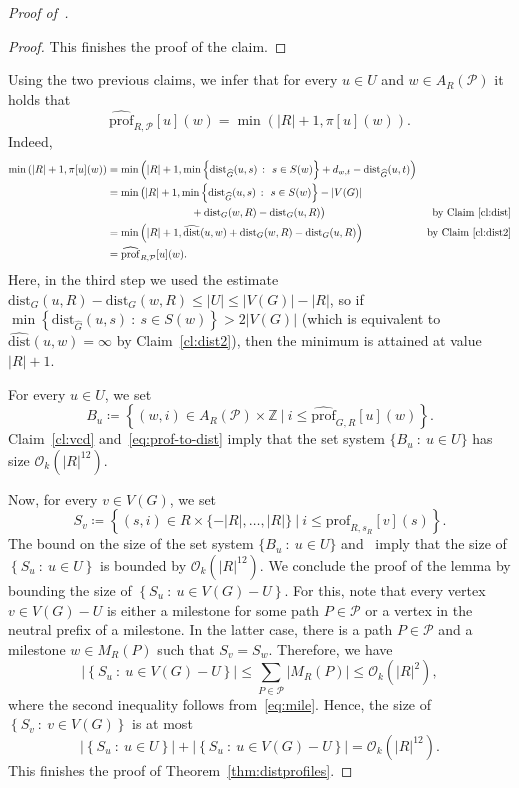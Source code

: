\documentclass[11pt,a4paper]{article}
\newcommand{\Oh}{\mathcal{O}}
\newcommand{\distprofile}[3]{\mathrm{prof}_{#1,#2}[#3]}
\newcommand{\hatprofile}[3]{\widehat{\mathrm{prof}}_{#1,#2}[#3]}
\newcommand{\dist}{\mathrm{dist}}
\renewcommand{\leq}{\leqslant}
\renewcommand{\le}{\leqslant}
\renewcommand{\setminus}{-}
\begin{document}
\begin{proof}[Proof of~]
\begin{proof}
    This finishes the proof of the claim.
  \end{proof}
  
  Using the two previous claims, we infer that for every $u \in U$ and $w \in A_R(\mathcal{P})$ it holds that
  \begin{equation}\label{eq:prof-to-dist}
    \hatprofile{R}{\mathcal{P}}{u}(w) = \min(|R|+1, \pi[u](w)).
  \end{equation}
  Indeed, 
  \begin{align*}
  \min\left(|R|+1, \pi[u](w)\right) &= \min\left(|R|+1,\min\left\{\dist_{\widehat{G}}(u,s)~\colon~s\in S(w)\right\}+d_{w,t}-\dist_{\widehat{G}}(u,t)\right)\\
  &=\min\big(|R|+1, \min\left\{\dist_{\widehat{G}}(u,s)~\colon~s\in S(w)\right\} - |V(G)| &\\
  &\qquad\qquad\qquad\qquad + \dist_G(w,R)-\dist_G(u,R)\big) &\text{by Claim~\ref{cl:dist}}\\
  &=\min\left(|R|+1, \widehat{\dist}(u,w) + \dist_G(w,R)-\dist_G(u,R)\right)&\text{by Claim~\ref{cl:dist2}}\\
  &=\hatprofile{R}{\mathcal{P}}{u}(w).
  \end{align*}
  Here, in the third step we used the estimate $\dist_G(u,R) - \dist_G(w,R) \leq |U| \leq |V(G)|-|R|$, 
  so if $\min\left\{\dist_{\widehat{G}}(u,s)~\colon~s\in S(w)\right\} > 2|V(G)|$
  (which is equivalent to $\widehat{\dist}(u,w) = \infty$ by Claim~\ref{cl:dist2}),
  then the minimum is attained at value $|R|+1$.

  For every $u\in U$, we set
    $$B_u\coloneqq\left\{(w,i) \in A_R(\mathcal{P}) \times \mathbb{Z}~|~i \leq \hatprofile{G}{R}{u}(w)\right\}.$$
  Claim~\ref{cl:vcd} and~\eqref{eq:prof-to-dist} imply that the set system $\{B_u~\colon~u\in U\}$
    has size $\mathcal{O}_k(|R|^{12})$.

  
  
  Now, for every $v\in V(G)$, we set $$S_v\coloneqq\left\{(s,i) \in R \times \{-|R|,\ldots,|R|\}~|~i \leq \distprofile{R}{s_R}{v}(s)\right\}.$$
  The bound on the size of the set system $\{B_u~\colon~u \in U\}$ and~
  imply that the size of $\left\{S_u~\colon~u \in U \right\}$ is bounded by $\Oh_k(|R|^{12})$.
  We conclude the proof of the lemma by bounding the size of $\left\{S_u~\colon~u \in V(G)\setminus U \right\}$. For this, note that every vertex $v\in V(G)\setminus U$ is either a milestone for some path $P\in\mathcal{P}$ or a vertex in the neutral prefix of a milestone.
  In the latter case, there is a path $P\in\mathcal{P}$ and a milestone $w\in M_R(P)$ such that $S_v=S_w$. Therefore, we have
  $$|\left\{S_u~\colon~u \in V(G)\setminus U \right\}|\le \sum_{P\in\mathcal{P}} |M_R(P)|\le \mathcal{O}_k(|R|^2),$$
  where the second inequality follows from~\eqref{eq:mile}.
  Hence, the size of $\left\{S_v~\colon~v \in V(G)\right\}$ is at most $$|\left\{S_u~\colon~u \in U\right\}|+|\left\{S_u~\colon~u \in V(G)\setminus U\right\}|=\Oh_k(|R|^{12}).$$
  This finishes the proof of Theorem~\ref{thm:distprofiles}.
\end{proof}
 
\end{document}
